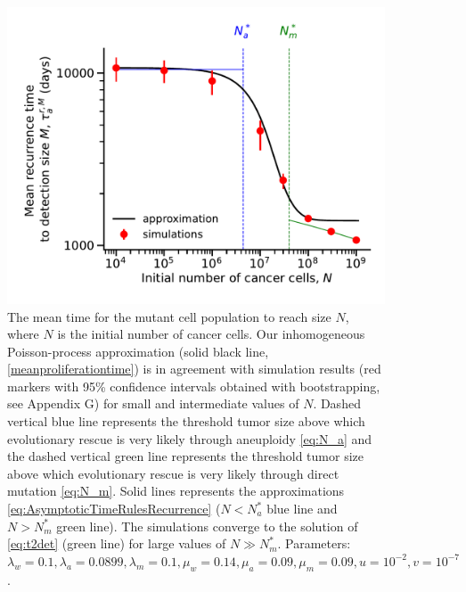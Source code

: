 \documentclass[12pt]{extarticle}
\begin{document}
\begin{figure}
\vspace*{1\baselineskip}
\includegraphics[width=1\textwidth]{Figures/RecurrencePlot.pdf}
\caption{The mean time for the mutant cell population to reach size $N$, where $N$ is the initial number of cancer cells.
Our inhomogeneous Poisson-process approximation (solid black line, \cref{meanproliferationtime}) is in agreement with simulation results (red markers with 95\% confidence intervals obtained with bootstrapping, see Appendix G) for small and intermediate values of $N$. Dashed vertical blue line represents the threshold tumor size above which evolutionary rescue is very likely through aneuploidy \cref{eq:N_a} and the dashed vertical green line represents the threshold tumor size above which evolutionary rescue is very likely through direct mutation \cref{eq:N_m}. Solid lines represents the approximations \cref{eq:AsymptoticTimeRulesRecurrence} ($N<N_a^*$ blue line and $N>N_m^*$ green line). The simulations converge to the solution of \cref{eq:t2det} (green line) for large values of $N\gg N_m^*$.  Parameters: $\lambda_w=0.1,\lambda_a=0.0899,\lambda_m=0.1,\mu_w=0.14,\mu_a=0.09,\mu_m=0.09, u=10^{-2}, v=10^{-7}$.}
\label{RecurrencePlot}
\end{figure}
\end{document}
